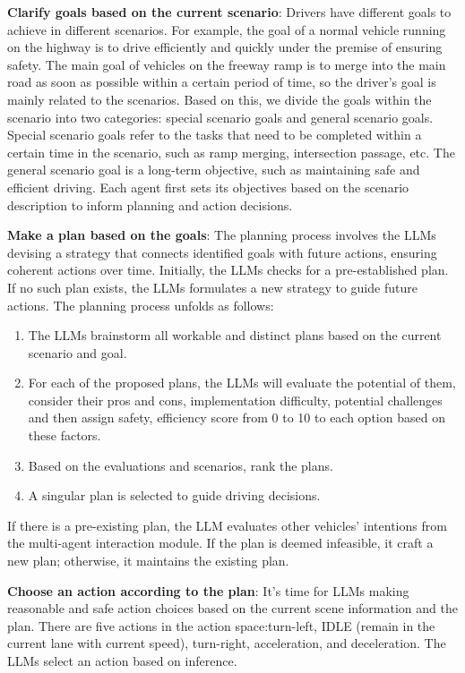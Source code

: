 \documentclass[lettersize,journal]{IEEEtran}
\begin{document}
\textbf{Clarify goals based on the current scenario}:
Drivers have different goals to achieve in different scenarios. For example, the goal of a normal vehicle running on the highway is to drive efficiently and quickly under the premise of ensuring safety. The main goal of vehicles on the freeway ramp is to merge into the main road as soon as possible within a certain period of time, so the driver's goal is mainly related to the scenarios. Based on this, we divide the goals within the scenario into two categories: special scenario goals and general scenario goals. Special scenario goals refer to the tasks that need to be completed within a certain time in the scenario, such as ramp merging, intersection passage, etc. The general scenario goal is a long-term objective, such as maintaining safe and efficient driving. Each agent first sets its objectives based on the scenario description to inform planning and action decisions.

\textbf{Make a plan based on the goals}: The planning process involves the LLMs devising a strategy that connects identified goals with future actions, ensuring coherent actions over time. Initially, the LLMs checks for a pre-established plan. If no such plan exists, the LLMs formulates a new strategy to guide future actions. The planning process unfolds as follows:
\begin{enumerate}
\item The LLMs brainstorm all workable and distinct plans based on the current scenario and goal.
\item For each of the proposed plans, the LLMs will evaluate the potential of them, consider their pros and cons, implementation difficulty, potential challenges and then assign safety, efficiency score from 0 to 10 to each option based on these factors.
\item Based on the evaluations and scenarios, rank the plans.
\item A singular plan is selected to guide driving decisions.
\end{enumerate}
If there is a pre-existing plan, the LLM evaluates other vehicles' intentions from the multi-agent interaction module. If the plan is deemed infeasible, it craft a new plan; otherwise, it maintains the existing plan.

\textbf{Choose an action according to the plan}: It's time for LLMs making reasonable and safe action choices based on the current scene information and the plan. There are five actions in the action space:turn-left, IDLE (remain in the current lane with current speed), turn-right, acceleration, and deceleration. The LLMs select an action based on inference.
\end{document}
